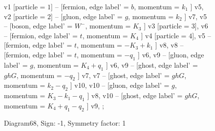\documentclass{revtex4}
\begin{document}
\begin{figure}[!htb]
\begin{center}
{    %
v1 [particle = \(1\)] -- [fermion, edge label' = \(b\), momentum = \(k_{1}\) ] v5, 
v2 [particle = \(2\)] -- [gluon, edge label' = \(g\), momentum = \(k_{2}\) ] v7, 
v5 -- [boson, edge label' = \(W^{-}\), momentum = \(K_{3}\) ] v3 [particle = \(3\)], 
v6 -- [fermion, edge label' = \(t\), momentum = \(K_{4}\) ] v4 [particle = \(4\)], 
v5 -- [fermion, edge label' = \(t\), momentum = \(-K_{3} + k_{1}\) ] v8, 
v8 -- [fermion, edge label' = \(t\), momentum = \(-q_{1}\) ] v6, 
v9 -- [gluon, edge label' = \(g\), momentum = \(K_{4} + q_{1}\) ] v6, 
v9 -- [ghost, edge label' = \(ghG\), momentum = \(-q_{2}\) ] v7, 
v7 -- [ghost, edge label' = \(ghG\), momentum = \(k_{2} - q_{2}\) ] v10, 
v10 -- [gluon, edge label' = \(g\), momentum = \(K_{3} - k_{1} - q_{1}\) ] v8, 
v10 -- [ghost, edge label' = \(ghG\), momentum = \(K_{4} + q_{1} - q_{2}\) ] v9, 
};
\end{center}
\caption{Diagram68, Sign: -1, Symmetry factor: 1}
\end{figure}
\newpage
\end{document}
